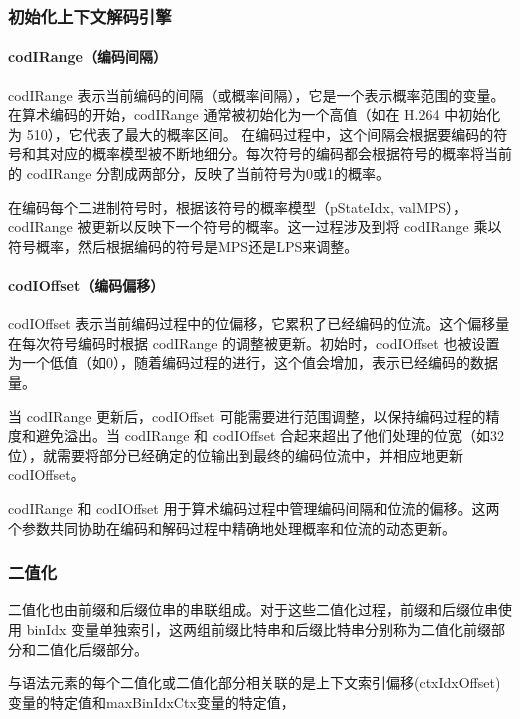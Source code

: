 \documentclass{/Users/hi/Study/template/code}
\begin{document}
\subsubsection{初始化上下文解码引擎}
\paragraph{codIRange（编码间隔）}
codIRange 表示当前编码的间隔（或概率间隔），它是一个表示概率范围的变量。在算术编码的开始，codIRange 通常被初始化为一个高值（如在 H.264 中初始化为 510），它代表了最大的概率区间。
在编码过程中，这个间隔会根据要编码的符号和其对应的概率模型被不断地细分。每次符号的编码都会根据符号的概率将当前的 codIRange 分割成两部分，反映了当前符号为0或1的概率。

在编码每个二进制符号时，根据该符号的概率模型（pStateIdx, valMPS），codIRange 被更新以反映下一个符号的概率。这一过程涉及到将 codIRange 乘以符号概率，然后根据编码的符号是MPS还是LPS来调整。


\paragraph{codIOffset（编码偏移）}
codIOffset 表示当前编码过程中的位偏移，它累积了已经编码的位流。这个偏移量在每次符号编码时根据 codIRange 的调整被更新。初始时，codIOffset 也被设置为一个低值（如0），随着编码过程的进行，这个值会增加，表示已经编码的数据量。

当 codIRange 更新后，codIOffset 可能需要进行范围调整，以保持编码过程的精度和避免溢出。当 codIRange 和 codIOffset 合起来超出了他们处理的位宽（如32位），就需要将部分已经确定的位输出到最终的编码位流中，并相应地更新 codIOffset。

codIRange 和 codIOffset 用于算术编码过程中管理编码间隔和位流的偏移。这两个参数共同协助在编码和解码过程中精确地处理概率和位流的动态更新。

\subsubsection{二值化}

二值化也由前缀和后缀位串的串联组成。对于这些二值化过程，前缀和后缀位串使用 binIdx 变量单独索引，这两组前缀比特串和后缀比特串分别称为二值化前缀部分和二值化后缀部分。

与语法元素的每个二值化或二值化部分相关联的是上下文索引偏移(ctxIdxOffset)变量的特定值和maxBinIdxCtx变量的特定值，
\end{document}
